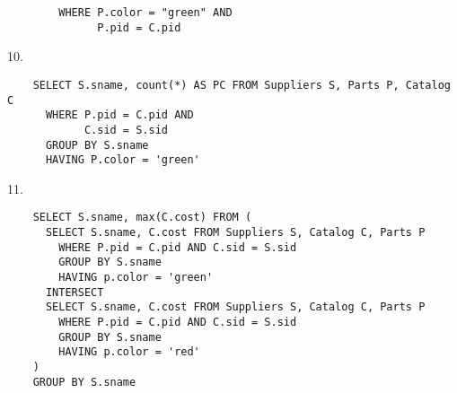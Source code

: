 \begin{problem}{5.2}
\begin{lstlisting}
        WHERE P.color = "green" AND
              P.pid = C.pid
  \end{lstlisting}
  10.
  \begin{lstlisting}
    SELECT S.sname, count(*) AS PC FROM Suppliers S, Parts P, Catalog C
      WHERE P.pid = C.pid AND
            C.sid = S.sid
      GROUP BY S.sname
      HAVING P.color = 'green'
  \end{lstlisting}
  11.
  \begin{lstlisting}
    SELECT S.sname, max(C.cost) FROM (
      SELECT S.sname, C.cost FROM Suppliers S, Catalog C, Parts P
        WHERE P.pid = C.pid AND C.sid = S.sid
        GROUP BY S.sname
        HAVING p.color = 'green'
      INTERSECT
      SELECT S.sname, C.cost FROM Suppliers S, Catalog C, Parts P
        WHERE P.pid = C.pid AND C.sid = S.sid
        GROUP BY S.sname
        HAVING p.color = 'red'
    )
    GROUP BY S.sname
  \end{lstlisting}
\end{problem}

